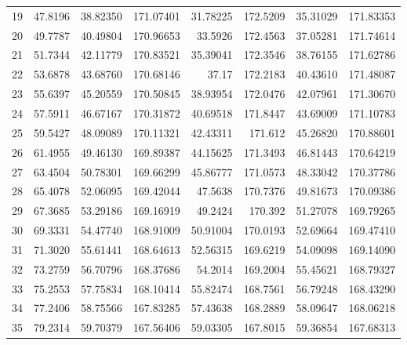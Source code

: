 \begin{table}[ht!]
{\begin{tabular}{@{}rrrrrrrr@{}}
19 & 47.8196 & 38.82350 & 171.07401 & 31.78225 & 172.5209 & 35.31029 & 171.83353 \\
20 & 49.7787 & 40.49804 & 170.96653 & 33.5926  & 172.4563 & 37.05281 & 171.74614 \\
21 & 51.7344 & 42.11779 & 170.83521 & 35.39041 & 172.3546 & 38.76155 & 171.62786 \\
22 & 53.6878 & 43.68760 & 170.68146 & 37.17    & 172.2183 & 40.43610 & 171.48087 \\
23 & 55.6397 & 45.20559 & 170.50845 & 38.93954 & 172.0476 & 42.07961 & 171.30670 \\
24 & 57.5911 & 46.67167 & 170.31872 & 40.69518 & 171.8447 & 43.69009 & 171.10783 \\
25 & 59.5427 & 48.09089 & 170.11321 & 42.43311 & 171.612  & 45.26820 & 170.88601 \\
26 & 61.4955 & 49.46130 & 169.89387 & 44.15625 & 171.3493 & 46.81443 & 170.64219 \\
27 & 63.4504 & 50.78301 & 169.66299 & 45.86777 & 171.0573 & 48.33042 & 170.37786 \\
28 & 65.4078 & 52.06095 & 169.42044 & 47.5638  & 170.7376 & 49.81673 & 170.09386 \\
29 & 67.3685 & 53.29186 & 169.16919 & 49.2424  & 170.392  & 51.27078 & 169.79265 \\
30 & 69.3331 & 54.47740 & 168.91009 & 50.91004 & 170.0193 & 52.69664 & 169.47410 \\
31 & 71.3020 & 55.61441 & 168.64613 & 52.56315 & 169.6219 & 54.09098 & 169.14090 \\
32 & 73.2759 & 56.70796 & 168.37686 & 54.2014  & 169.2004 & 55.45621 & 168.79327 \\
33 & 75.2553 & 57.75834 & 168.10414 & 55.82474 & 168.7561 & 56.79248 & 168.43290 \\
34 & 77.2406 & 58.75566 & 167.83285 & 57.43638 & 168.2889 & 58.09647 & 168.06218 \\
35 & 79.2314 & 59.70379 & 167.56406 & 59.03305 & 167.8015 & 59.36854 & 167.68313 \\ \bottomrule
\end{tabular}%
}
\end{table}
\vfill
\clearpage

